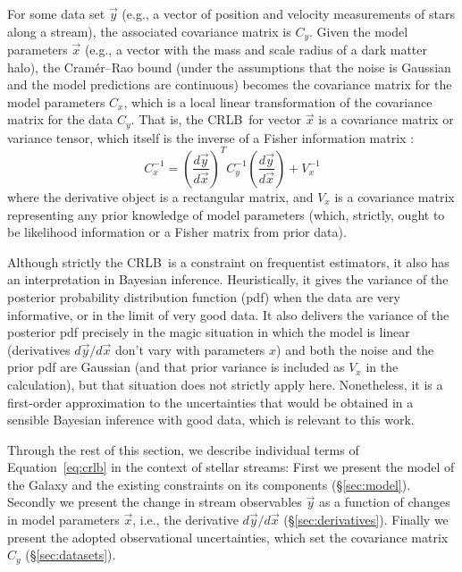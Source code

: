 \documentclass[modern]{aastex61}
\newcommand{\acronym}[1]{{\small{#1}}}
\newcommand{\CRLB}{\acronym{CRLB}}
\begin{document}
For some data set $\vec{y}$ (e.g., a vector of position and velocity measurements of stars along a stream), the associated covariance matrix is $C_y$.
Given the model parameters $\vec{x}$ (e.g., a vector with the mass and scale radius of a dark matter halo), the Cram\' er--Rao bound (under the assumptions that the noise is Gaussian and the model predictions are continuous) becomes the covariance matrix for the model parameters $C_x$, which is a local linear transformation of the covariance matrix for the data $C_y$.
That is, the \CRLB\ for vector $\vec{x}$ is a covariance matrix or variance tensor, which itself is the inverse of a Fisher information matrix \citep{fisher}:
\begin{equation}
C_x^{-1} = \left(\frac{d\vec{y}}{d\vec{x}}\right)^{T} C_y^{-1} \left(\frac{d\vec{y}}{d\vec{x}}\right) + V_x^{-1}
\label{eq:crlb}
\end{equation}
where the derivative object is a rectangular matrix, and $V_x$ is a covariance matrix representing any prior knowledge of model parameters (which, strictly, ought to be likelihood information or a Fisher matrix from prior data).

Although strictly the \CRLB\ is a constraint on frequentist estimators, it also has an interpretation in Bayesian inference.
Heuristically, it gives the variance of the posterior probability distribution function (pdf) when the data are very informative, or in the limit of very good data.
It also delivers the variance of the posterior pdf precisely in the magic situation in which the model is linear (derivatives $d\vec{y}/d\vec{x}$ don't vary with parameters $x$) and both the noise and the prior pdf are Gaussian (and that prior variance is included as $V_x$ in the calculation), but that situation does not strictly apply here.
Nonetheless, it is a first-order approximation to the uncertainties that would be obtained in a sensible Bayesian inference with good data, which is relevant to this work.

Through the rest of this section, we describe individual terms of Equation~\ref{eq:crlb} in the context of stellar streams:
First we present the model of the Galaxy and the existing constraints on its components (\S\ref{sec:model}).
Secondly we present the change in stream observables $\vec{y}$ as a function of changes in model parameters $\vec{x}$, i.e., the derivative $d\vec{y}/d\vec{x}$ (\S\ref{sec:derivatives}).
Finally we present the adopted observational uncertainties, which set the covariance matrix $C_y$ (\S\ref{sec:datasets}).
\end{document}
